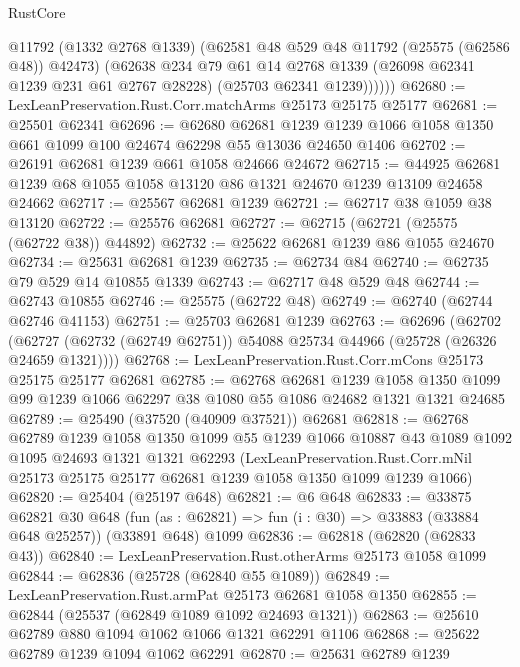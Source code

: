 \begin{lexlean}{RustCore}
\begin{coremodule}
            @11792
            (@1332 @2768 @1339)
            (@62581 @48 @529 @48 @11792 (@25575 (@62586 @48)) @42473)
            (@62638
              @234
              @79
              @61
              @14
              @2768
              @1339
              (@26098 @62341 @1239 @231 @61 @2767 @28228)
              (@25703 @62341 @1239))))))
@62680 := LexLeanPreservation.Rust.Corr.matchArms @25173 @25175 @25177
@62681 := @25501 @62341
@62696 := @62680
    @62681
    @1239
    @1239
    @1066
    @1058
    @1350
    @661
    @1099
    @100
    @24674
    @62298
    @55
    @13036
    @24650
    @1406
@62702 := @26191 @62681 @1239 @661 @1058 @24666 @24672
@62715 := @44925 @62681 @1239 @68 @1055 @1058 @13120 @86 @1321 @24670 @1239 @13109 @24658 @24662
@62717 := @25567 @62681 @1239
@62721 := @62717 @38 @1059 @38 @13120
@62722 := @25576 @62681
@62727 := @62715 (@62721 (@25575 (@62722 @38)) @44892)
@62732 := @25622 @62681 @1239 @86 @1055 @24670
@62734 := @25631 @62681 @1239
@62735 := @62734 @84
@62740 := @62735 @79 @529 @14 @10855 @1339
@62743 := @62717 @48 @529 @48
@62744 := @62743 @10855
@62746 := @25575 (@62722 @48)
@62749 := @62740 (@62744 @62746 @41153)
@62751 := @25703 @62681 @1239
@62763 := @62696
    (@62702 (@62727 (@62732 (@62749 @62751)) @54088 @25734 @44966 (@25728 (@26326 @24659 @1321))))
@62768 := LexLeanPreservation.Rust.Corr.mCons @25173 @25175 @25177 @62681
@62785 := @62768
    @62681
    @1239
    @1058
    @1350
    @1099
    @99
    @1239
    @1066
    @62297
    @38
    @1080
    @55
    @1086
    @24682
    @1321
    @1321
    @24685
@62789 := @25490 (@37520 (@40909 @37521)) @62681
@62818 := @62768
    @62789
    @1239
    @1058
    @1350
    @1099
    @55
    @1239
    @1066
    @10887
    @43
    @1089
    @1092
    @1095
    @24693
    @1321
    @1321
    @62293
    (LexLeanPreservation.Rust.Corr.mNil
      @25173
      @25175
      @25177
      @62681
      @1239
      @1058
      @1350
      @1099
      @1239
      @1066)
@62820 := @25404 (@25197 @648)
@62821 := @6 @648
@62833 := @33875
    @62821
    @30
    @648
    (fun (as : @62821) => fun (i : @30) => @33883 (@33884 @648 @25257))
    (@33891 @648)
    @1099
@62836 := @62818 (@62820 (@62833 @43))
@62840 := LexLeanPreservation.Rust.otherArms @25173 @1058 @1099
@62844 := @62836 (@25728 (@62840 @55 @1089))
@62849 := LexLeanPreservation.Rust.armPat @25173 @62681 @1058 @1350
@62855 := @62844 (@25537 (@62849 @1089 @1092 @24693 @1321))
@62863 := @25610 @62789 @880 @1094 @1062 @1066 @1321 @62291 @1106
@62868 := @25622 @62789 @1239 @1094 @1062 @62291
@62870 := @25631 @62789 @1239

\end{coremodule}
\end{lexlean}
